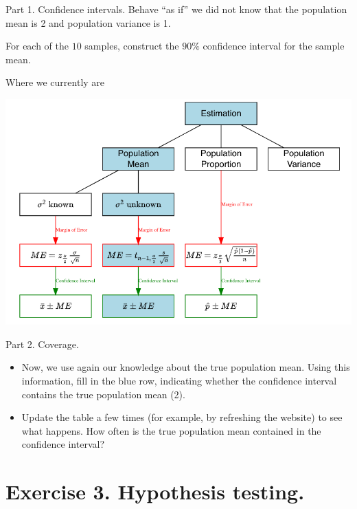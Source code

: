 \documentclass[
  10pt,
  ignorenonframetext,
]{beamer}
\begin{document}
\begin{frame}{Part 1. Confidence intervals.}
\protect\hypertarget{part-1.-confidence-intervals.}{}
Behave ``as if'' we did not know that the population mean is 2 and
population variance is 1.

For each of the \(10\) samples, construct the \(90\%\) confidence
interval for the sample mean.
\end{frame}

\begin{frame}{Where we currently are}
\protect\hypertarget{where-we-currently-are-2}{}
\begin{center}\includegraphics[width=0.9\linewidth]{pictures/EstimationGuide-Case2} \end{center}
\end{frame}

\begin{frame}{Part 2. Coverage.}
\protect\hypertarget{part-2.-coverage.}{}
\begin{itemize}
\item
  Now, we use again our knowledge about the true population mean. Using
  this information, fill in the blue row, indicating whether the
  confidence interval contains the true population mean (2).
\item
  Update the table a few times (for example, by refreshing the website)
  to see what happens. How often is the true population mean contained
  in the confidence interval?
\end{itemize}
\end{frame}

\hypertarget{exercise-3.-hypothesis-testing.}{%
\section{Exercise 3. Hypothesis
testing.}\label{exercise-3.-hypothesis-testing.}}
\end{document}
